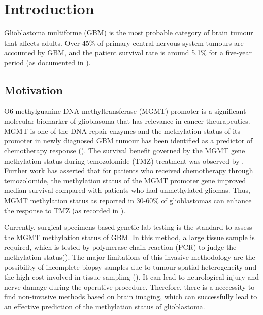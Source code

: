 \chapter{Introduction}
\ifpdf
    \graphicspath{{Introduction/IntroductionFigs/PNG/}{Introduction/IntroductionFigs/PDF/}{Introduction/IntroductionFigs/}}
\else
    \graphicspath{{Introduction/IntroductionFigs/EPS/}{Introduction/IntroductionFigs/}}
\fi

\nomenclature[gp]{$\pi$}{ $\simeq 3.14\ldots$}  

Glioblastoma multiforme (GBM) is the most probable category of brain tumour that affects adults. Over 45\% of primary central nervous system tumours are accounted by GBM, and the patient survival rate is around 5.1\% for a five-year period (as documented in \cite{GBM_survival}). 



\section {Motivation}
O6-methylguanine-DNA methyltransferase (MGMT) promoter is a significant  molecular biomarker of glioblasoma that has relevance in cancer theurapeutics. MGMT is one of the DNA repair enzymes and the methylation status of its promoter in newly diagnosed GBM tumour has been identified as a predictor of chemotherapy response (\cite{GBM_chemo}).  The survival benefit governed by the MGMT gene methylation status during temozolomide (TMZ) treatment was observed by \cite{GBM_TMZ}. Further work has asserted that for patients who received chemotherapy through temozolomide, the methylation status of the MGMT promoter gene improved median survival compared with patients who had unmethylated gliomas. Thus, MGMT methylation status as reported in 30-60\% of glioblastomas can enhance the response to TMZ (as recorded in \cite{GBM_TMZ_2}).
\vspace*{3mm} 

Currently, surgical specimens based genetic lab testing is the standard to assess the MGMT methylation status of GBM. In this method, a large tissue sample is required, which is tested by polymerase chain reaction (PCR) to judge the methylation status(\cite{biopsy_1}). The major limitations of this invasive methodology are the possibility of incomplete biopsy samples due to tumour spatial heterogeneity and the high cost involved in tissue sampling (\cite{biopsy_2}). It can lead to neurological injury and nerve damage during the operative procedure. Therefore, there is a neccessity to find non-invasive methods based on brain imaging, which can successfully lead to an effective prediction of the methylation status of glioblastoma.

